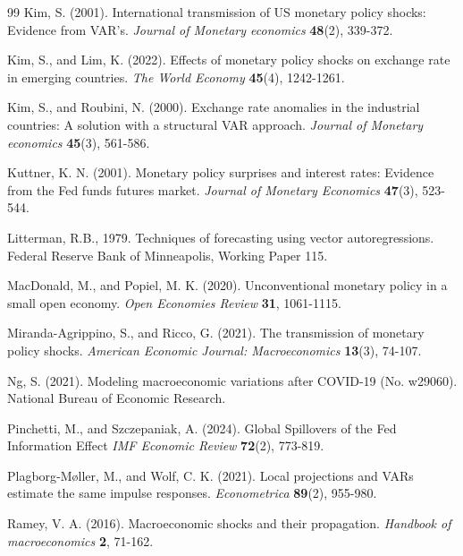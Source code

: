 \documentclass[12pt, reqno]{article}
\begin{document}
\begin{thebibliography}{99}
\bibitem{} \hypertarget{Kim (2001)}{}Kim, S. (2001). International transmission of US monetary policy shocks: Evidence from VAR's. \textit{Journal of Monetary economics} \textbf{48}(2), 339-372.

\bibitem{} \hypertarget{Kim and Lim (2022)}{}Kim, S., and Lim, K. (2022). Effects of monetary policy shocks on exchange rate in emerging countries. \textit{The World Economy} \textbf{45}(4), 1242-1261.

\bibitem{} \hypertarget{Kim and Roubini (2000)}{}Kim, S., and Roubini, N. (2000). Exchange rate anomalies in the industrial countries: A solution with a structural VAR approach. \textit{Journal of Monetary economics} \textbf{45}(3), 561-586.





\bibitem{} \hypertarget{Kuttner (2001)}{} Kuttner, K. N. (2001). Monetary policy surprises and interest rates: Evidence from the Fed funds futures market. \textit{Journal of Monetary Economics} \textbf{47}(3), 523-544.

\bibitem{} \hypertarget{Litterman (1979)}{} Litterman, R.B., 1979. Techniques of forecasting using vector autoregressions. Federal Reserve Bank of Minneapolis, Working Paper 115.

\bibitem{} \hypertarget{MacDonald and Popiel (2020)}{}
MacDonald, M., and Popiel, M. K. (2020). Unconventional monetary policy in a small open economy. \textit{Open Economies Review} \textbf{31}, 1061-1115.


\bibitem{} \hypertarget{Miranda-Agrippino and Ricco (2021)}{} 
Miranda-Agrippino, S., and Ricco, G. (2021). The transmission of monetary policy shocks. \textit{American Economic Journal: Macroeconomics} \textbf{13}(3), 74-107.

\bibitem{} \hypertarget{Ng (2021)}{} 
Ng, S. (2021). Modeling macroeconomic variations after COVID-19 (No. w29060). National Bureau of Economic Research.

\bibitem{} \hypertarget{Pinchetti and Szczepaniak (2024)}{} 
Pinchetti, M., and Szczepaniak, A. (2024). Global Spillovers of the Fed Information Effect \textit{IMF Economic Review} \textbf{72}(2), 773-819.

\bibitem{} \hypertarget{Plagborg (2021)}{} 
Plagborg‐Møller, M., and Wolf, C. K. (2021). Local projections and VARs estimate the same impulse responses. \textit{Econometrica} \textbf{89}(2), 955-980.

\bibitem{} \hypertarget{Ramey (2016)}{}Ramey, V. A. (2016). Macroeconomic shocks and their propagation. \textit{Handbook of macroeconomics} \textbf{2}, 71-162.


\end{thebibliography}
\end{document}

